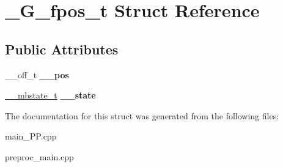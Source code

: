 \hypertarget{struct__G__fpos__t}{\section{\+\_\+\+G\+\_\+fpos\+\_\+t Struct Reference}
\label{struct__G__fpos__t}
}
\subsection*{Public Attributes}
\begin{DoxyCompactItemize}
\item 
\hypertarget{struct__G__fpos__t_a1f3f051dff02b13553766b90e703ac1a}{\+\_\+\+\_\+off\+\_\+t {\bfseries \+\_\+\+\_\+pos}}\label{struct__G__fpos__t_a1f3f051dff02b13553766b90e703ac1a}

\item 
\hypertarget{struct__G__fpos__t_a7bedfe55beff20f064b4cefa4f65e81d}{\hyperlink{struct____mbstate__t}{\+\_\+\+\_\+mbstate\+\_\+t} {\bfseries \+\_\+\+\_\+state}}\label{struct__G__fpos__t_a7bedfe55beff20f064b4cefa4f65e81d}

\end{DoxyCompactItemize}


The documentation for this struct was generated from the following files\+:\begin{DoxyCompactItemize}
\item 
main\+\_\+\+P\+P.\+cpp\item 
preproc\+\_\+main.\+cpp\end{DoxyCompactItemize}
